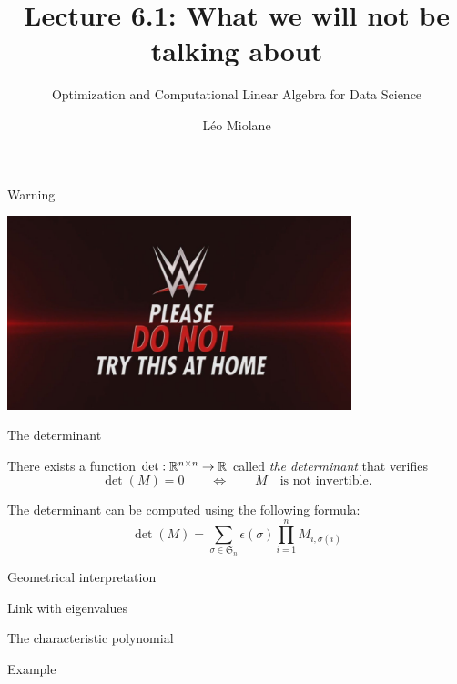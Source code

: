 \documentclass{beamer}
\title{Lecture 6.1: What we will not be talking about}
\subtitle{Optimization and Computational Linear Algebra for Data Science}
\author{Léo Miolane}
\date{}
\begin{document}
\setcounter{showProgressBar}{0}
\setcounter{showSlideNumbers}{0}

\frame{\titlepage}
\setcounter{framenumber}{0}
\setcounter{showSlideNumbers}{1}


\begin{frame}{Warning}
	\begin{center}
		\includegraphics[width=10cm]{try.jpg}
	\end{center}
\end{frame}
\begin{frame}[t]{The determinant}
	\grid

	There exists a function $\det: \mathbb{R}^{n \times n} \to \mathbb{R}$ called \emph{the determinant} that verifies
	$$
	\det(M) = 0 \qquad
	\Longleftrightarrow
	\qquad
	M \quad \text{is not invertible.}
	$$

	\vspace{0.3cm}
	The determinant can be computed using the following formula:
	$$
	\det(M)
	= \sum_{\sigma \in \mathfrak{S}_n} \epsilon(\sigma) \prod_{i=1}^n
	M_{i,\sigma(i)}
	$$
\end{frame}

\begin{frame}[t]{Geometrical interpretation}
	\grid

\end{frame}

\begin{frame}[t]{Link with eigenvalues}
	\grid

\end{frame}

\begin{frame}[t]{The characteristic polynomial}
	\grid

\end{frame}

\begin{frame}[t]{Example}
	\grid

\end{frame}
\end{document}
